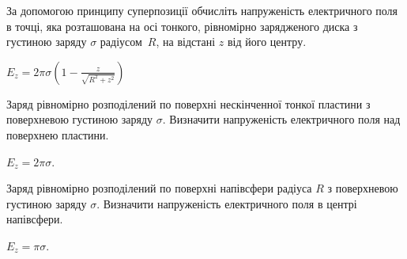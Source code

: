 
\begin{problem}\label{prb:disk}
За допомогою принципу суперпозиції обчисліть напруженість електричного поля в точці, яка розташована на осі тонкого, рівномірно зарядженого диска з густиною заряду $\sigma$ радіусом~$R$, на відстані $z$ від його центру.
\begin{solution}
	$E_z = 2\pi\sigma \left( 1 - \frac{z}{\sqrt{R^2 + z^2}}\right)$
\end{solution}
\end{problem}

\begin{problem}\label{prb:surface}
Заряд рівномірно розподілений по поверхні нескінченної тонкої пластини з поверхневою густиною заряду $\sigma$. Визначити напруженість електричного поля над поверхнею пластини.
\begin{solution}
	$E_z = 2\pi\sigma$.
\end{solution}
\end{problem}

\begin{problem}\label{hemisphere}
Заряд рівномірно розподілений по поверхні напівсфери радіуса $R$ з поверхневою густиною заряду $\sigma$. Визначити напруженість електричного поля в центрі напівсфери.
\begin{solution}
	$E_z = \pi\sigma$.
\end{solution}
\end{problem}

